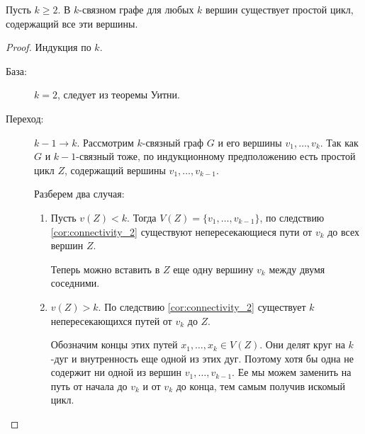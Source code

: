 \begin{theorem}[Дирак]
	Пусть $k \ge 2$. В $k$-связном графе для любых $k$ вершин существует простой цикл, содержащий все эти вершины.
\end{theorem}
\begin{proof}
    Индукция по $k$.
	\begin{description}
		\item[База:] $k=2$, следует из теоремы Уитни.
		\item[Переход:] $k-1 \to k$. Рассмотрим $k$-связный граф $G$ и его вершины $v_1, \ldots , v_{k}$. 
			Так как $G$ и  $k-1$-связный тоже, по индукционному предположению  есть простой цикл $Z$, содержащий вершины $v_1, \ldots , v_{k-1}$.
			
			Разберем два случая:
			\begin{enumerate}
				\item Пусть $v(Z) <k$. Тогда $V(Z) = \{v_1, \ldots , v_{k-1}\}$, по следствию \ref{cor:connectivity_2} существуют непересекающиеся пути от $v_k$ до всех вершин $Z$.

					Теперь можно вставить в $Z$ еще одну вершину $v_k$ между двумя соседними.
				\item $v(Z) > k$. По следствию \ref{cor:connectivity_2} существует  $k$ непересекающихся путей от $v_k$ до $Z$. 

					Обозначим концы этих путей $x_1, \ldots , x_k \in  V(Z)$. Они делят круг на $k$-дуг и внутренность еще одной из этих дуг. Поэтому хотя бы одна не содержит ни одной из вершин $v_1, \ldots , v_{k-1}$. Ее мы можем заменить на путь от начала до $v_k$  и от $v_k$ до конца, тем самым получив искомый цикл.
			\end{enumerate}
	\end{description}
\end{proof}
